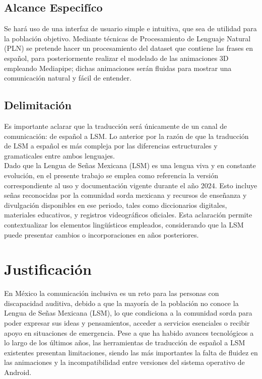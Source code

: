\subsection{Alcance Especifíco}
Se hará uso de una interfaz de usuario simple e intuitiva, que sea de utilidad para la población objetivo. Mediante técnicas de Procesamiento de Lenguaje Natural (PLN) se pretende hacer un procesamiento del dataset que contiene las frases en español, para posteriormente realizar el modelado de las animaciones 3D empleando Mediapipe; dichas animaciones serán fluidas para mostrar una comunicación natural y fácil de entender.

\subsection{Delimitación}
Es importante aclarar que la traducción será únicamente de un canal de comunicación: de español a LSM. Lo anterior por la razón de que la traducción de LSM a español es más compleja por las diferencias estructurales y gramaticales entre ambos lenguajes.\\

Dado que la Lengua de Señas Mexicana (LSM) es una lengua viva y en constante evolución, en el presente trabajo se emplea como referencia la versión correspondiente al uso y documentación vigente durante el año 2024. Esto incluye señas reconocidas por la comunidad sorda mexicana y recursos de enseñanza y divulgación disponibles en ese periodo, tales como diccionarios digitales, materiales educativos, y registros videográficos oficiales. Esta aclaración permite contextualizar los elementos lingüísticos empleados, considerando que la LSM puede presentar cambios o incorporaciones en años posteriores.

\section{Justificación}
En México la comunicación inclusiva es un reto para las personas con discapacidad auditiva, debido a que la mayoría de la población no conoce la Lengua de Señas Mexicana (LSM), lo que condiciona a la comunidad sorda para poder expresar sus ideas y pensamientos, acceder a servicios esenciales o recibir apoyo en situaciones de emergencia. Pese a que ha habido avances tecnológicos a lo largo de los últimos años, las herramientas de traducción de español a LSM existentes presentan limitaciones, siendo las más importantes la falta de fluidez en las animaciones y la incompatibilidad entre versiones del sistema operativo de Android. \\

